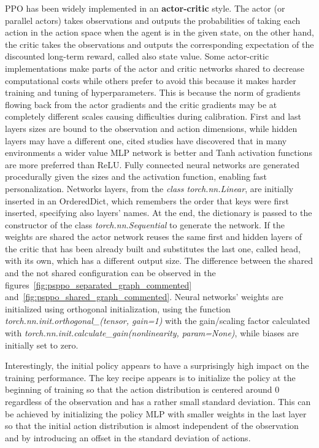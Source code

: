 \documentclass[11pt, a4paper, hidelinks]{report}
\begin{document}
PPO has been widely implemented in an \textbf{actor-critic} style.
The actor (or parallel actors) takes observations and outputs the probabilities of taking each action in the action space when the agent is in the given state, on the other hand, the critic takes the observations and outputs the corresponding expectation of the discounted long-term reward, called also state value.
Some actor-critic implementations make parts of the actor and critic networks shared to decrease computational costs while others prefer to avoid this because it makes harder training and tuning of hyperparameters.
This is because the norm of gradients flowing back from the actor gradients and the critic gradients may be at completely different scales causing difficulties during calibration.
First and last layers sizes are bound to the observation and action dimensions, while hidden layers may have a different one, cited studies have discovered that in many environments a wider value MLP network is better and Tanh activation functions are more preferred than ReLU\@.
Fully connected neural networks are generated procedurally given the sizes and the activation function, enabling fast personalization.
Networks layers, from the \textit{class torch.nn.Linear}, are initially inserted in an OrderedDict, which remembers the order that keys were first inserted, specifying also layers' names.
At the end, the dictionary is passed to the constructor of the class \textit{torch.nn.Sequential} to generate the network.
If the weights are shared the actor network reuses the same first and hidden layers of the critic that has been already built and substitutes the last one, called head, with its own, which has a different output size.
The difference between the shared and the not shared configuration can be observed in the figures~\ref{fig:psppo_separated_graph_commented} and~\ref{fig:psppo_shared_graph_commented}.
Neural networks' weights are initialized using orthogonal initialization, using the function \textit{torch.nn.init.orthogonal\_(tensor, gain=1)} with the gain/scaling factor calculated with \textit{torch.nn.init.calculate\_gain(nonlinearity, param=None)}, while biases are initially set to zero.

\begin{quoting}[font=itshape, begintext={"}, endtext={"\citep{ppo-implementation-2}}]
Interestingly, the initial policy appears to have a surprisingly high impact on the training performance.
The key recipe appears is to initialize the policy at the beginning of training so that the action distribution is centered around 0 regardless of the observation and has a rather small standard deviation.
This can be achieved by initializing the policy MLP with smaller weights in the last layer so that the initial action distribution is almost independent of the observation and by introducing an offset in the standard deviation of actions.
\end{quoting}
\end{document}
